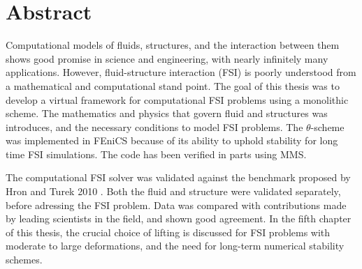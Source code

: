 \section*{Abstract}
Computational models of fluids, structures, and the interaction between them shows good promise in science and engineering, with nearly infinitely many applications. However, fluid-structure interaction (FSI) is poorly understood from a mathematical and computational stand point. The goal of this thesis was to develop a virtual framework for computational FSI problems using a monolithic scheme. The mathematics and physics that govern fluid and structures was introduces, and the necessary conditions to model FSI problems. The $\theta$-scheme was implemented in FEniCS because of its ability to uphold stability for long time FSI simulations. The code has been verified in parts using MMS.\newline

The computational FSI solver was validated against the benchmark proposed by Hron and Turek 2010 \cite{Hron2006a}. Both the fluid and structure were validated separately, before adressing the FSI problem. Data was compared with contributions made by leading scientists in the field, and shown good agreement. In the fifth chapter of this thesis, the crucial choice of lifting is discussed for FSI problems with moderate to large deformations, and the need for long-term numerical stability schemes.



